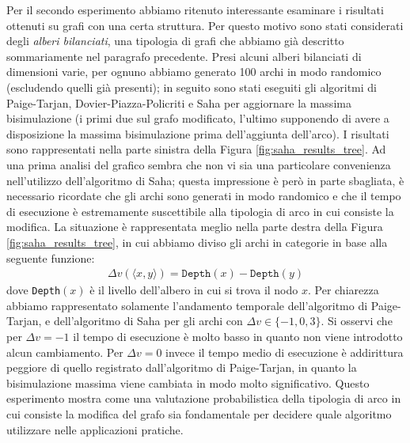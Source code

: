 Per il secondo esperimento abbiamo ritenuto interessante esaminare i risultati ottenuti su grafi con una certa struttura. Per questo motivo sono stati considerati degli \emph{alberi bilanciati}, una tipologia di grafi che abbiamo già descritto sommariamente nel paragrafo precedente. Presi alcuni alberi bilanciati di dimensioni varie, per ognuno abbiamo generato 100 archi in modo randomico (escludendo quelli già presenti); in seguito sono stati eseguiti gli algoritmi di Paige-Tarjan, Dovier-Piazza-Policriti e Saha per aggiornare la massima bisimulazione (i primi due sul grafo modificato, l'ultimo supponendo di avere a disposizione la massima bisimulazione prima dell'aggiunta dell'arco). I risultati sono rappresentati nella parte sinistra della Figura \ref{fig:saha_results_tree}. Ad una prima analisi del grafico sembra che non vi sia una particolare convenienza nell'utilizzo dell'algoritmo di Saha; questa impressione è però in parte sbagliata, è necessario ricordate che gli archi sono generati in modo randomico e che il tempo di esecuzione è estremamente suscettibile alla tipologia di arco in cui consiste la modifica. La situazione è rappresentata meglio nella parte destra della Figura \ref{fig:saha_results_tree}, in cui abbiamo diviso gli archi in categorie in base alla seguente funzione:
\begin{gather*}
    \Delta v(\langle x,y \rangle) = \texttt{Depth}(x) - \texttt{Depth}(y)
\end{gather*}
dove \texttt{Depth}$(x)$ è il livello dell'albero in cui si trova il nodo $x$. Per chiarezza abbiamo rappresentato solamente l'andamento temporale dell'algoritmo di Paige-Tarjan, e dell'algoritmo di Saha per gli archi con $\Delta v \in \{-1,0,3\}$. Si osservi che per $\Delta v = -1$ il tempo di esecuzione è molto basso in quanto non viene introdotto alcun cambiamento. Per $\Delta v = 0$ invece il tempo medio di esecuzione è addirittura peggiore di quello registrato dall'algoritmo di Paige-Tarjan, in quanto la bisimulazione massima viene cambiata in modo molto significativo. Questo esperimento mostra come una valutazione probabilistica della tipologia di arco in cui consiste la modifica del grafo sia fondamentale per decidere quale algoritmo utilizzare nelle applicazioni pratiche.


